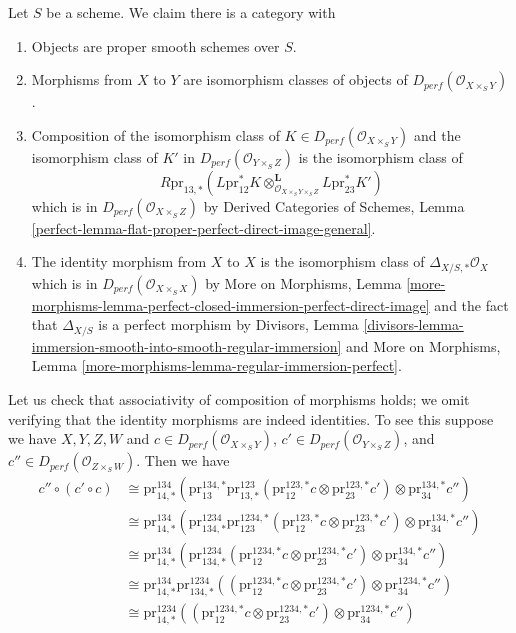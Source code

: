 \noindent
Let $S$ be a scheme. We claim there is a category
with
\begin{enumerate}
\item Objects are proper smooth schemes over $S$.
\item Morphisms from $X$ to $Y$ are isomorphism classes
of objects of $D_{perf}(\mathcal{O}_{X \times_S Y})$.
\item Composition of the isomorphism class of
$K \in D_{perf}(\mathcal{O}_{X \times_S Y})$
and the isomorphism class of $K'$ in $D_{perf}(\mathcal{O}_{Y \times_S Z})$
is the isomorphism class of
$$
R\text{pr}_{13, *}(
L\text{pr}_{12}^*K
\otimes_{\mathcal{O}_{X \times_S Y \times_S Z}}^\mathbf{L}
L\text{pr}_{23}^*K')
$$
which is in $D_{perf}(\mathcal{O}_{X \times_S Z})$ by
Derived Categories of Schemes, Lemma
\ref{perfect-lemma-flat-proper-perfect-direct-image-general}.
\item The identity morphism from $X$ to $X$ is the
isomorphism class of $\Delta_{X/S, *}\mathcal{O}_X$
which is in $D_{perf}(\mathcal{O}_{X \times_S X})$
by More on Morphisms, Lemma
\ref{more-morphisms-lemma-perfect-closed-immersion-perfect-direct-image}
and the fact that $\Delta_{X/S}$ is a perfect morphism by
Divisors, Lemma
\ref{divisors-lemma-immersion-smooth-into-smooth-regular-immersion} and
More on Morphisms, Lemma \ref{more-morphisms-lemma-regular-immersion-perfect}.
\end{enumerate}
Let us check that associativity of composition
of morphisms holds; we omit verifying that the identity
morphisms are indeed identities. To see this suppose we have
$X, Y, Z, W$ and
$c \in D_{perf}(\mathcal{O}_{X \times_S Y})$,
$c' \in D_{perf}(\mathcal{O}_{Y \times_S Z})$, and
$c'' \in D_{perf}(\mathcal{O}_{Z \times_S W})$. Then we have
\begin{align*}
c'' \circ (c' \circ c)
& \cong
\text{pr}^{134}_{14, *}(
\text{pr}^{134, *}_{13}
\text{pr}^{123}_{13, *}(\text{pr}^{123, *}_{12}c \otimes
\text{pr}^{123, *}_{23}c')
\otimes \text{pr}^{134, *}_{34}c'') \\
& \cong
\text{pr}^{134}_{14, *}(
\text{pr}^{1234}_{134, *}
\text{pr}^{1234, *}_{123}(\text{pr}^{123, *}_{12}c \otimes
\text{pr}^{123, *}_{23}c')
\otimes \text{pr}^{134, *}_{34}c'') \\
& \cong
\text{pr}^{134}_{14, *}(
\text{pr}^{1234}_{134, *}
(\text{pr}^{1234, *}_{12}c \otimes
\text{pr}^{1234, *}_{23}c')
\otimes \text{pr}^{134, *}_{34}c'') \\
& \cong
\text{pr}^{134}_{14, *}
\text{pr}^{1234}_{134, *}
((\text{pr}^{1234, *}_{12}c \otimes
\text{pr}^{1234, *}_{23}c')
\otimes \text{pr}^{1234, *}_{34}c'') \\
& \cong
\text{pr}^{1234}_{14, *}(
(\text{pr}^{1234, *}_{12}c \otimes
\text{pr}^{1234, *}_{23}c') \otimes
\text{pr}^{1234, *}_{34}c'')
\end{align*}
